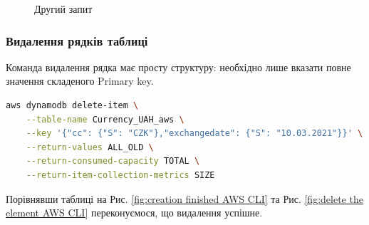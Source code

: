 \documentclass[a4paper,14pt]{extarticle} %
\begin{document}
\begin{figure}[H]
    \caption{Другий запит}
    \label{fig:second query AWS CLI}
\end{figure}

\subsubsection*{Видалення рядків таблиці}

Команда видалення рядка має просту структуру: необхідно лише вказати повне значення складеного Primary key. 

\begin{lstlisting}[language=bash, stringstyle=\small\ttfamily, emphstyle={[1]\small\ttfamily}]
    aws dynamodb delete-item \
    --table-name Currency_UAH_aws \
    --key '{"cc": {"S": "CZK"},"exchangedate": {"S": "10.03.2021"}}' \
    --return-values ALL_OLD \
    --return-consumed-capacity TOTAL \
    --return-item-collection-metrics SIZE
\end{lstlisting}

Порівнявши таблиці на Рис. \ref{fig:creation finished AWS CLI} та Рис. \ref{fig:delete the element AWS CLI} 
переконуємося, що видалення успішне.
\end{document}
